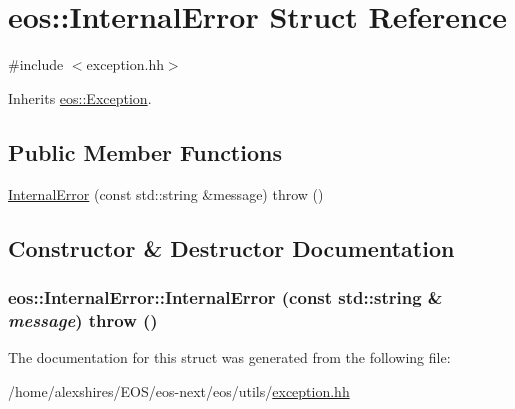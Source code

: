 \hypertarget{structeos_1_1InternalError}{
\section{eos::InternalError Struct Reference}
\label{structeos_1_1InternalError}
}


{\ttfamily \#include $<$exception.hh$>$}

Inherits \hyperlink{classeos_1_1Exception}{eos::Exception}.\subsection*{Public Member Functions}
\begin{DoxyCompactItemize}
\item 
\hyperlink{structeos_1_1InternalError_ae4b3f79d99d58833babeb1e743853390}{InternalError} (const std::string \&message)  throw ()
\end{DoxyCompactItemize}


\subsection{Constructor \& Destructor Documentation}
\hypertarget{structeos_1_1InternalError_ae4b3f79d99d58833babeb1e743853390}{
\subsubsection[{InternalError}]{\setlength{\rightskip}{0pt plus 5cm}eos::InternalError::InternalError (const std::string \& {\em message})  throw ()}}
\label{structeos_1_1InternalError_ae4b3f79d99d58833babeb1e743853390}


The documentation for this struct was generated from the following file:\begin{DoxyCompactItemize}
\item 
/home/alexshires/EOS/eos-\/next/eos/utils/\hyperlink{exception_8hh}{exception.hh}\end{DoxyCompactItemize}
